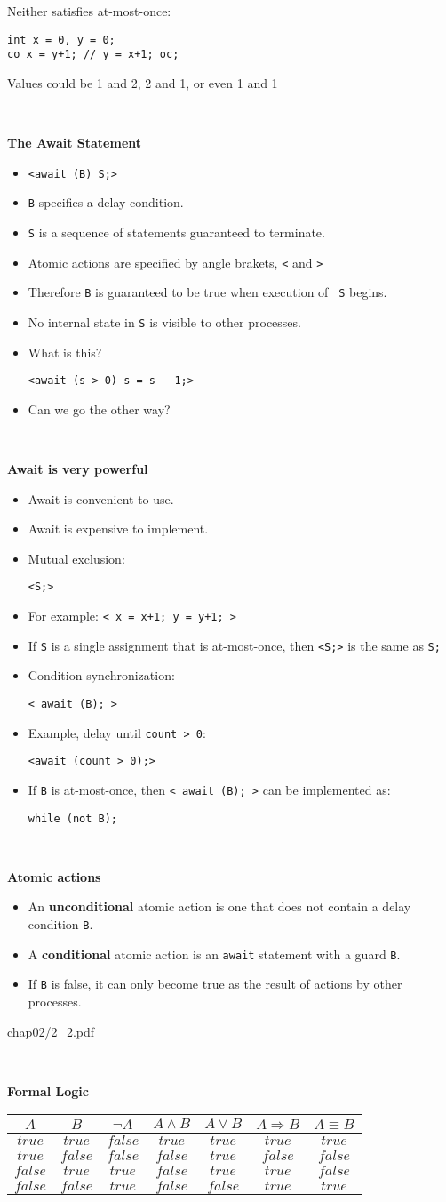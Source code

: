\documentclass{article}
\newcommand{\myfig}[1]{\begin{overpic}[scale=1.5]{#1}}
\newcommand{\myfigend}{\end{overpic}\newpage}
\newcommand{\bi}{\begin{itemize}}
\newcommand{\ii}{\item}
\newcommand{\ei}{\end{itemize}}
\newcommand{\ti}[1]{
\mbox{~}

\vspace{1.25in}
\centerline{\bf #1}}
\begin{document}
\vspace{1in}

Neither satisfies at-most-once:
\begin{verbatim}
int x = 0, y = 0;
co x = y+1; // y = x+1; oc;
\end{verbatim}
Values could be 1 and 2, 2 and 1, or even 1 and 1

\newpage
\ti{The Await Statement}

\bi
\ii {\tt <await (B) S;>}
\ii {\tt B} specifies a delay condition.
\ii {\tt S} is a sequence of statements guaranteed to terminate.
\ii Atomic actions are specified by angle brakets, {\tt <} and {\tt >}
\ii Therefore {\tt B} is guaranteed to be true when execution of {\tt
  S} begins.
\ii No internal state in {\tt S} is visible to other processes.
\ii What is this?

\centerline {\tt <await (s > 0) s = s - 1;>}

\vspace{1cm}

\ii Can we go the other way?
\ei

\newpage
\ti{Await is very powerful}
\bi
\ii Await is convenient to use.
\ii Await is expensive to implement.
\ii Mutual exclusion:

\centerline{\tt <S;>}

\ii For example:  {\tt < x = x+1; y = y+1; > }
\ii If {\tt S} is a single assignment that is at-most-once, then {\tt <S;>}
is the same as {\tt S;}
\ii Condition synchronization:

\centerline{\tt < await (B); >}

\ii Example, delay until {\tt count > 0}:

\centerline{\tt <await (count > 0);>}

\ii If {\tt B} is at-most-once, then {\tt < await (B); >} can be
implemented as:

\centerline{\tt while (not B);}
\ei

\newpage
\ti{Atomic actions}
\bi
\ii An {\bf unconditional} atomic action is one that does not contain
a delay condition {\tt B}.
\ii A {\bf conditional} atomic action is an {\tt await} statement with
a guard {\tt B}.  
\ii If {\tt B} is false, it can only become true as the result of
actions by other processes.
\ei


\newpage
\myfig{chap02/2_2.pdf}
\myfigend

\ti{Formal Logic}

\begin{center}
\begin{tabular}{cc|ccccc}
$ A $&$ B $&$\neg A$&$ A \wedge B $&$ A \vee B $&$ A \Rightarrow B $&$A\equiv B$\\\hline
$true$&$ true$&$ false$&$ true$&$true$&$true$&$true$\\
$true$&$ false$&$ false$&$false$&$true$&$false$&$false$\\
$false$&$ true$&$ true$&$false$&$true$&$true$&$false$\\
$false$&$ false$&$ true$&$false$&$false$&$true$&$true$\\
\end{tabular}
\end{center}
\end{document}
